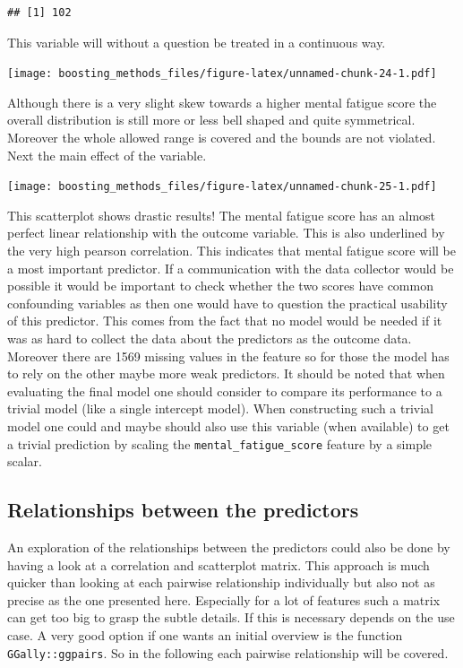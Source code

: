 \documentclass[
]{book}
\begin{document}
\begin{verbatim}
## [1] 102
\end{verbatim}

This variable will without a question be treated in a continuous way.

\texttt{[image: boosting\_methods\_files/figure-latex/unnamed-chunk-24-1.pdf]}

Although there is a very slight skew towards a higher mental fatigue score the overall distribution is still more or less bell shaped and quite symmetrical. Moreover the whole allowed range is covered and the bounds are not violated. Next the main effect of the variable.

\texttt{[image: boosting\_methods\_files/figure-latex/unnamed-chunk-25-1.pdf]}

This scatterplot shows drastic results! The mental fatigue score has an almost perfect linear relationship with the outcome variable. This is also underlined by the very high pearson correlation. This indicates that mental fatigue score will be a most important predictor. If a communication with the data collector would be possible it would be important to check whether the two scores have common confounding variables as then one would have to question the practical usability of this predictor. This comes from the fact that no model would be needed if it was as hard to collect the data about the predictors as the outcome data. Moreover there are 1569 missing values in the feature so for those the model has to rely on the other maybe more weak predictors. It should be noted that when evaluating the final model one should consider to compare its performance to a trivial model (like a single intercept model). When constructing such a trivial model one could and maybe should also use this variable (when available) to get a trivial prediction by scaling the \texttt{mental\_fatigue\_score} feature by a simple scalar.

\hypertarget{relationships-between-the-predictors}{%
\subsection{Relationships between the predictors}\label{relationships-between-the-predictors}}

An exploration of the relationships between the predictors could also be done by having a look at a correlation and scatterplot matrix. This approach is much quicker than looking at each pairwise relationship individually but also not as precise as the one presented here. Especially for a lot of features such a matrix can get too big to grasp the subtle details. If this is necessary depends on the use case. A very good option if one wants an initial overview is the function \texttt{GGally::ggpairs}. So in the following each pairwise relationship will be covered.
\end{document}
